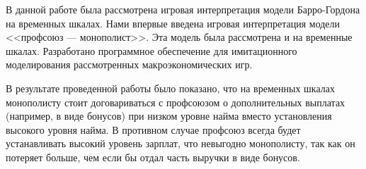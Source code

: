 
В данной работе была рассмотрена игровая интерпретация модели Барро-Гордона на
временных шкалах.  Нами впервые введена игровая интерпретация модели <<профсоюз
--- монополист>>. Эта модель была рассмотрена и на временные шкалах.
Разработано программное обеспечение для имитационного моделирования
рассмотренных макроэкономических игр. 

В результате проведенной работы было показано, что на временных шкалах
монополисту стоит договариваться с профсоюзом о дополнительных выплатах
(например, в виде бонусов) при низком уровне найма вместо установления высокого
уровня найма.  В противном случае профсоюз всегда будет устанавливать высокий
уровень зарплат, что невыгодно монополисту, так как он потеряет больше, чем
если бы отдал часть выручки в виде бонусов.
